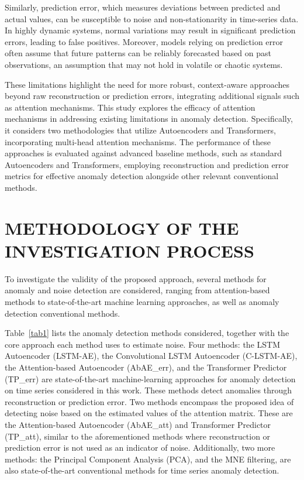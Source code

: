 \documentclass[conference]{IEEEtran}
\begin{document}
Similarly, prediction error, which measures deviations between predicted and actual values, can be susceptible to noise and non-stationarity in time-series data. In highly dynamic systems, normal variations may result in significant prediction errors, leading to false positives. Moreover, models relying on prediction error often assume that future patterns can be reliably forecasted based on past observations, an assumption that may not hold in volatile or chaotic systems. 

These limitations highlight the need for more robust, context-aware approaches beyond raw reconstruction or prediction errors, integrating additional signals such as attention mechanisms.
This study explores the efficacy of attention mechanisms in addressing existing limitations in anomaly detection. Specifically, it considers two methodologies that utilize Autoencoders and Transformers, incorporating multi-head attention mechanisms. 
The performance of these approaches is evaluated against advanced baseline methods, such as standard Autoencoders and Transformers, employing reconstruction and prediction error metrics for effective anomaly detection alongside other relevant conventional methods.



\section{METHODOLOGY OF THE INVESTIGATION PROCESS}
\label{sec:method}

To investigate the validity of the proposed approach, several methods for anomaly and noise detection are considered, ranging from attention-based methods to state-of-the-art machine learning approaches, as well as anomaly detection conventional methods.

Table~\ref{tab1} lists the anomaly detection methods considered, together with the core approach each method uses to estimate noise. Four methods: the LSTM Autoencoder (LSTM-AE), the Convolutional LSTM Autoencoder (C-LSTM-AE), the Attention-based Autoencoder (AbAE\_err), and the Transformer Predictor (TP\_err) are state-of-the-art machine-learning approaches for anomaly detection on time series considered in this work. These methods detect anomalies through reconstruction or prediction error. Two methods encompass the proposed idea of detecting noise based on the estimated values of the attention matrix. These are the Attention-based Autoencoder (AbAE\_att) and Transformer Predictor (TP\_att), similar to the aforementioned methods where reconstruction or prediction error is not used as an indicator of noise. Additionally, two more methods: the Principal Component Analysis (PCA), and the MNE filtering, are also state-of-the-art conventional methods for time series anomaly detection.
\end{document}
